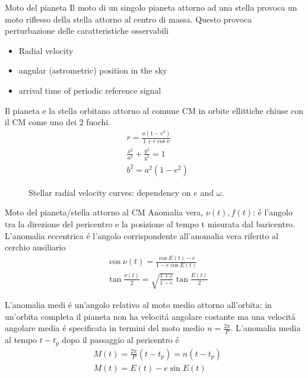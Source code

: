 \begin{frame}{Moto del pianeta}
Il moto di un singolo pianeta attorno ad una stella provoca un moto riflesso della stella attorno al centro di massa. Questo provoca perturbazione delle caratteristiche osservabili
\begin{itemize}
    \item Radial velocity
    \item angular (astrometric) position in the sky
    \item arrival time of periodic reference signal 
\end{itemize}
Il pianeta e la stella orbitano attorno al comune CM in orbite ellittiche chiuse con il CM come uno dei 2 fuochi.
\begin{align*}
&r=\frac{a(1-e^2)}{1+e\cos{\nu}}\\
&\frac{x^2}{a^2}+\frac{y^2}{b^2}=1\\
&b^2=a^2(1-e^2)
\end{align*}
\begin{figure}[!ht]
\centering
\caption{Stellar radial velocity curves: dependency on $e$ and $\omega$.}
\end{figure}
\end{frame}

\begin{wordonframe}{Moto del pianeta/stella attorno al CM}
Anomalia vera, $\nu(t), f(t)$: \'e l'angolo tra la direzione del pericentro e la posizione al tempo t misurata dal baricentro. L'anomalia eccentrica \'e l'angolo corrispondente all'anomalia vera riferito al cerchio ausiliario
\begin{align*}
&\cos{\nu(t)}=\frac{\cos{E(t)}-e}{1-e\cos{E(t)}}\\
&\tan{\frac{\nu(t)}{2}}=\sqrt{\frac{1+e}{1-e}}\tan{\frac{E(t)}{2}}
\end{align*}

L'anomalia medi \'e un'angolo relativo al moto medio attorno all'orbita: in un'orbita completa il pianeta non ha velocit\'a angolare costante ma una velocit\'a angolare media \'e specificata in termini del moto medio $n=\frac{2\pi}{P}$. L'anomalia media al tempo $t-t_p$ dopo il passaggio al pericentro \'e
\begin{align*}
&M(t)=\frac{2\pi}{P}(t-t_p)=n(t-t_p)\\
&M(t)=E(t)-e\sin{E(t)}
\end{align*}
\end{wordonframe}
